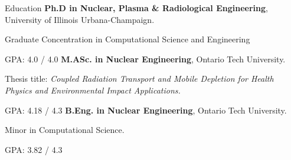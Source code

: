 \begin{rubric}{Education}
%
  \textbf{Ph.D in Nuclear, Plasma \& Radiological Engineering}, University of Illinois Urbana-Champaign.
  \par Graduate Concentration in Computational Science and Engineering
  \par GPA: 4.0 / 4.0
%
%
  \textbf{M.ASc. in Nuclear Engineering}, Ontario Tech University.
  \par Thesis title: \emph{Coupled Radiation Transport and Mobile Depletion for Health Physics and Environmental Impact Applications.}
  \par GPA: 4.18 / 4.3
%
%
  \textbf{B.Eng. in Nuclear Engineering}, Ontario Tech University. \par Minor in Computational Science.
  \par GPA: 3.82 / 4.3
%
\end{rubric}
